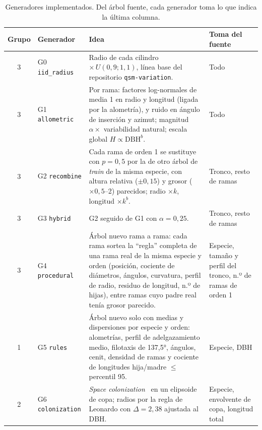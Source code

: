 \documentclass[11pt,a4paper]{article}
\begin{document}
\begin{table}[t]
\centering
\caption{Generadores implementados. Del árbol fuente, cada generador toma lo que indica la última columna.}
\label{tab:gen}
\small
\begin{tabular}{clp{7.1cm}p{2.9cm}}
\toprule
Grupo & Generador & Idea & Toma del fuente \\
\midrule
3 & G0 \texttt{iid\_radius} & Radio de cada cilindro $\times\,U(0{,}9;1{,}1)$, línea base del repositorio \texttt{qsm-variation}. & Todo \\
3 & G1 \texttt{allometric} & Por rama: factores log-normales de media 1 en radio y longitud (ligada por la alometría), y ruido en ángulo de inserción y azimut; magnitud $\alpha\times$ variabilidad natural; escala global $H\propto\text{DBH}^{b}$. & Todo \\
3 & G2 \texttt{recombine} & Cada rama de orden 1 se sustituye con $p=0{,}5$ por la de otro árbol de \emph{train} de la misma especie, con altura relativa ($\pm0{,}15$) y grosor ($\times0{,}5$--2) parecidos; radio $\times k$, longitud $\times k^{b}$. & Tronco, resto de ramas \\
3 & G3 \texttt{hybrid} & G2 seguido de G1 con $\alpha=0{,}25$. & Tronco, resto de ramas \\
3 & G4 \texttt{procedural} & Árbol nuevo rama a rama: cada rama sortea la \enquote{regla} completa de una rama real de la misma especie y orden (posición, cociente de diámetros, ángulos, curvatura, perfil de radio, residuo de longitud, n.º de hijas), entre ramas cuyo padre real tenía grosor parecido. & Especie, tamaño y perfil del tronco, n.º de ramas de orden 1 \\
1 & G5 \texttt{rules} & Árbol nuevo solo con medias y dispersiones por especie y orden: alometrías, perfil de adelgazamiento medio, filotaxis de 137,5°, ángulos, cenit, densidad de ramas y cociente de longitudes hija/madre $\le$ percentil 95. & Especie, DBH \\
2 & G6 \texttt{colonization} & \emph{Space colonization}~\cite{runions2007space} en un elipsoide de copa; radios por la regla de Leonardo con $\Delta=2{,}38$ ajustada al DBH. & Especie, envolvente de copa, longitud total \\
\bottomrule
\end{tabular}
\end{table}
\end{document}
